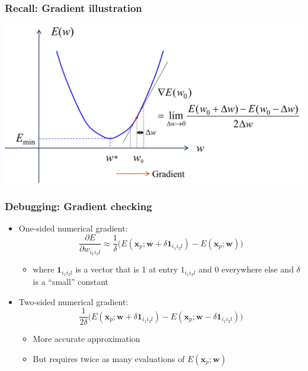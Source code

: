 \documentclass[12pt,notes,mathserif]{beamer}
\begin{document}
\begin{frame}[c]
\frametitle{Recall: Gradient illustration}
\begin{center}
\includegraphics[width=0.99\linewidth]{fig/lec612.jpg}
\end{center}
\end{frame}

\begin{frame}[c]
\frametitle{Debugging: Gradient checking}
\begin{itemize}
\item  One-sided numerical gradient:
\[
\frac{\partial E}{\partial w_{i_1i_2l}}\approx
\frac{1}{\delta}
\bigg(E\left(\mathbf{x}_p;\mathbf{w}+\delta\mathbf{1}_{i_1i_2l}\right)-E(\mathbf{x}_p;\mathbf{w})\bigg)
\]\vspace*{-5mm}
		\begin{itemize}
		\item where $\mathbf{1}_{i_1i_2l}$ is a vector that is 1 at entry $1_{i_1i_2l}$ and 0 everywhere else and $\delta$ is a ``small'' constant
		\end{itemize}
\item Two-sided numerical gradient:
\[
\frac{1}{2\delta}\bigg(E\left(\mathbf{x}_p;\mathbf{w}+\delta\mathbf{1}_{i_1i_2l}\right)-E(\mathbf{x}_p;\mathbf{w}-\delta\mathbf{1}_{i_1i_2l})\bigg)
\]\vspace*{-5mm}
		\begin{itemize}
		\item More accurate approximation
		\item But requires twice as many evaluations of $E(\mathbf{x}_p;\mathbf{w})$
		\end{itemize}
\end{itemize}
\end{frame}
\end{document}
